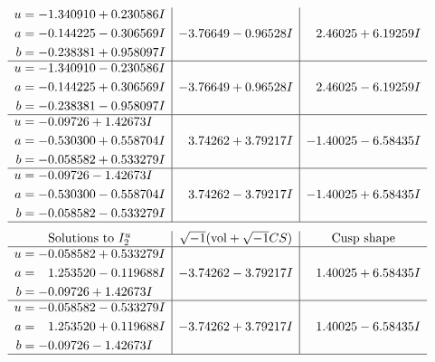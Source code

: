 \documentclass[1p]{elsarticle_modified}
\theoremstyle{definition}
\newcommand{\I}{\sqrt{-1}}
\begin{document}
$$\begin{array}{c|c|c}
\begin{aligned}
u &= -1.340910 + 0.230586 I \\
a &= -0.144225 - 0.306569 I \\
b &= -0.238381 + 0.958097 I\end{aligned}
 & -3.76649 - 0.96528 I & \phantom{-}2.46025 + 6.19259 I \\ \hline\begin{aligned}
u &= -1.340910 - 0.230586 I \\
a &= -0.144225 + 0.306569 I \\
b &= -0.238381 - 0.958097 I\end{aligned}
 & -3.76649 + 0.96528 I & \phantom{-}2.46025 - 6.19259 I \\ \hline\begin{aligned}
u &= -0.09726 + 1.42673 I \\
a &= -0.530300 + 0.558704 I \\
b &= -0.058582 + 0.533279 I\end{aligned}
 & \phantom{-}3.74262 + 3.79217 I & -1.40025 - 6.58435 I \\ \hline\begin{aligned}
u &= -0.09726 - 1.42673 I \\
a &= -0.530300 - 0.558704 I \\
b &= -0.058582 - 0.533279 I\end{aligned}
 & \phantom{-}3.74262 - 3.79217 I & -1.40025 + 6.58435 I\\
 \hline 
 \end{array}$$\newpage$$\begin{array}{c|c|c}  
\text{Solutions to }I^u_{2}& \I (\text{vol} + \sqrt{-1}CS) & \text{Cusp shape}\\
 \hline 
\begin{aligned}
u &= -0.058582 + 0.533279 I \\
a &= \phantom{-}1.253520 - 0.119688 I \\
b &= -0.09726 + 1.42673 I\end{aligned}
 & -3.74262 - 3.79217 I & \phantom{-}1.40025 + 6.58435 I \\ \hline\begin{aligned}
u &= -0.058582 - 0.533279 I \\
a &= \phantom{-}1.253520 + 0.119688 I \\
b &= -0.09726 - 1.42673 I\end{aligned}
 & -3.74262 + 3.79217 I & \phantom{-}1.40025 - 6.58435 I\\
 \hline 
 \end{array}$$\newpage
\newpage\renewcommand{\arraystretch}{1}
\end{document}
